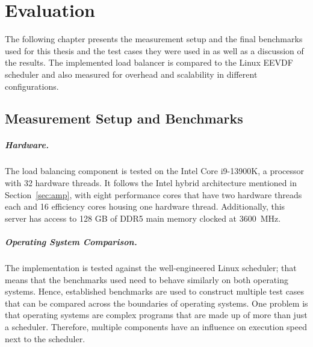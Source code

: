\chapter{Evaluation}
\label{sec:evaluation}


The following chapter presents the measurement setup and the final benchmarks used for this thesis and the test cases they were used in as well as a discussion of the results.
The implemented load balancer is compared to the Linux EEVDF scheduler and also measured for overhead and scalability in different configurations.

\section{Measurement Setup and Benchmarks}

\paragraph{Hardware.}

The load balancing component is tested on the Intel Core i9-13900K, a processor with 32 hardware threads.
It follows the Intel hybrid architecture mentioned in Section~\ref{sec:amp}, with eight performance cores that have two hardware threads each and 16 efficiency cores housing one hardware thread.
Additionally, this server has access to 128 GB of DDR5 main memory clocked at \SI{3600}{\mega\hertz}.

\paragraph{Operating System Comparison.}
\label{sec:os-comparison}

The implementation is tested against the well-engineered Linux scheduler; that means that the benchmarks used need to behave similarly on both operating systems.
Hence, established benchmarks are used to construct multiple test cases that can be compared across the boundaries of operating systems.
One problem is that operating systems are complex programs that are made up of more than just a scheduler.
Therefore, multiple components have an influence on execution speed next to the scheduler.

